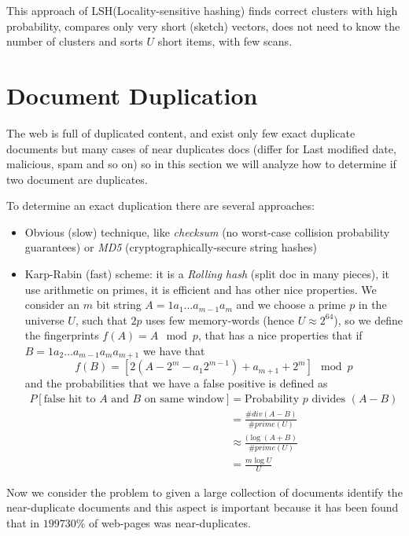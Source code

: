 \begin{enumerate}
	    This approach of LSH(Locality-sensitive hashing) finds correct clusters with high probability, compares only very short (sketch) vectors, does not need to know the number
	    of clusters and sorts $U$ short items, with few scans.

    \end{enumerate}

\section{Document Duplication}
    The web is full of duplicated content, and exist only few exact duplicate documents but many cases of near duplicates docs (differ for Last modified date, malicious, spam and so on)
    so in this section we will analyze how to determine if two document are duplicates.

   To determine an exact duplication there are several approaches:
   \begin{itemize}
	\item Obvious (slow) technique, like \emph{checksum} (no worst-case collision probability guarantees) or \emph{MD5} (cryptographically-secure string hashes)
	\item Karp-Rabin (fast) scheme: it is a \emph{Rolling hash} (split doc in many pieces), it use arithmetic on primes, it is efficient and has other nice properties.\newline
		We consider an $m$ bit string $A = 1 a_1 \dots a_{m-1} a_m$ and we choose a prime $p$ in the universe $U$, such that $2p$ uses few memory-words (hence $U \approx 2^{64}$),
	      so we define the fingerprints $f(A) = A \mod p$, that has a nice properties that if $B = 1 a_2 \dots a_{m-1} a_m a_{m+1}$ we have that 
	      \[ f(B) = [2(A - 2^m - a_1 2^{m-1}) + a_{m+1} + 2^m] \mod p \]
	      and the probabilities that we have a false positive is defined as 
	      \begin{align}
		      P[\text{false hit to } A \text{ and } B \text{ on same window}] & = \text{Probability } p \text{ divides } (A - B) \\
		                                                                      & = \frac{\# div(A - B)}{\#prime(U)} \\
										      & \approx \frac{(\log (A + B)}{\# prime(U)} \\
										      & = \frac{m \log U}{U} 
	      \end{align}
    \end{itemize}
    Now we consider the problem to given a large collection of documents identify the near-duplicate documents and this aspect is important because it has been found that
    in $1997 30\%$ of web-pages was near-duplicates.


